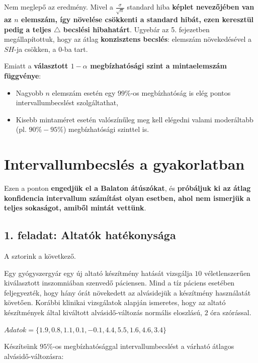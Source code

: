 \documentclass[
]{book}
\providecommand{\tightlist}{%
  \setlength{\itemsep}{0pt}\setlength{\parskip}{0pt}}
\begin{document}
Nem meglepő az eredmény. Mivel a \(\frac{\sigma}{\sqrt{n}}\) standard hiba \textbf{képlet nevezőjében van az \(n\) elemszám, így növelése csökkenti a standard hibát, ezen keresztül pedig a teljes \(\triangle\) becslési hibahatárt}. Ugyebár az 5. fejezetben megállapítottuk, hogy az átlag \textbf{konzisztens becslés}: elemszám növekedésével a \(SH\)-ja csökken, a \(0\)-ba tart.

Emiatt a \textbf{választott \(1-\alpha\) megbízhatósági szint a mintaelemszám függvénye}:

\begin{itemize}
\tightlist
\item
  Nagyobb \(n\) elemszám esetén egy \(99\%\)-os megbízhatóság is elég pontos intervallumbecslést szolgáltathat,
\item
  Kisebb mintaméret esetén valószínűleg meg kell elégedni valami moderáltabb (pl. \(90\%-95\%\)) megbízhatósági szinttel is.
\end{itemize}

\section{Intervallumbecslés a gyakorlatban}\label{intervallumbecsluxe9s-a-gyakorlatban}

Ezen a ponton \textbf{engedjük el a Balaton átúszókat}, és \textbf{próbáljuk ki az átlag konfidencia intervallum számítást olyan esetben, ahol nem ismerjük a teljes sokaságot, amiből mintát vettünk}.

\subsection*{1. feladat: Altatók hatékonysága}\label{feladat-altatuxf3k-hatuxe9konysuxe1ga}

A sztorink a következő.

Egy gyógyszergyár egy új altató készítmény hatását vizsgálja \(10\) véletlenszerűen kiválasztott inszomniában szenvedő páciensen. Mind a tíz páciens esetében feljegyezték, hogy hány órát növekedett az alvásidejük a készítmény használatát követően. Korábbi klinikai vizsgálatok alapján ismeretes, hogy az altató készítmények által kiváltott alvásidő-változás normális eloszlású, \(2\) óra szórással.

\(Adatok = \{1.9, 0.8, 1.1, 0.1, -0.1, 4.4, 5.5, 1.6, 4.6, 3.4\}\)

Készítsünk \(95\%\)-os megbízhatósággal intervallumbecslést a várható átlagos alvásidő-változásra:
\end{document}
